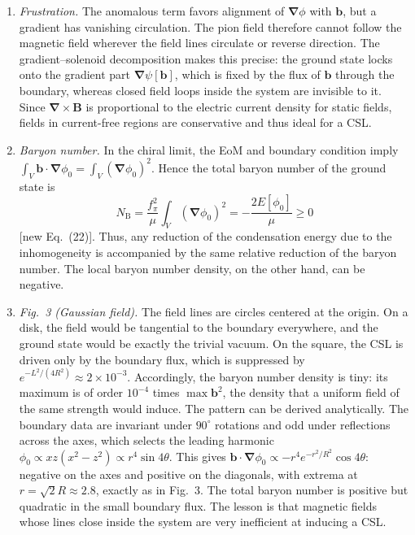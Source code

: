 \documentclass[11pt,a4paper]{article}
\newcommand{\vek}[1]{\bm{#1}}
\newcommand{\grad}{\vek\nabla}
\begin{document}
\begin{enumerate}[label=(\alph*)]
\item \emph{Frustration.} The anomalous term favors alignment of $\grad\phi$ with $\vek b$, but a gradient has vanishing circulation. The pion field therefore cannot follow the magnetic field wherever the field lines circulate or reverse direction. The gradient--solenoid decomposition makes this precise: the ground state locks onto the gradient part $\grad\psi[\vek b]$, which is fixed by the flux of $\vek b$ through the boundary, whereas closed field loops inside the system are invisible to it. Since $\grad\times\vek B$ is proportional to the electric current density for static fields, fields in current-free regions are conservative and thus ideal for a CSL.

\item \emph{Baryon number.} In the chiral limit, the EoM and boundary condition imply $\int_V\vek b\cdot\grad\phi_0=\int_V(\grad\phi_0)^2$. Hence the total baryon number of the ground state is
\begin{equation*}
N_\text{B}=\frac{f_\pi^2}{\mu}\int_V(\grad\phi_0)^2=-\frac{2E[\phi_0]}{\mu}\geq0
\end{equation*}
[new Eq.~(22)]. Thus, any reduction of the condensation energy due to the inhomogeneity is accompanied by the same relative reduction of the baryon number. The local baryon number density, on the other hand, can be negative.

\item \emph{Fig.~3 (Gaussian field).} The field lines are circles centered at the origin. On a disk, the field would be tangential to the boundary everywhere, and the ground state would be exactly the trivial vacuum. On the square, the CSL is driven only by the boundary flux, which is suppressed by $e^{-L^2/(4R^2)}\approx2\times10^{-3}$. Accordingly, the baryon number density is tiny: its maximum is of order $10^{-4}$ times $\max\vek b^2$, the density that a uniform field of the same strength would induce. The pattern can be derived analytically. The boundary data are invariant under $90^\circ$ rotations and odd under reflections across the axes, which selects the leading harmonic $\phi_0\propto xz(x^2-z^2)\propto r^4\sin4\theta$. This gives $\vek b\cdot\grad\phi_0\propto-r^4e^{-r^2/R^2}\cos4\theta$: negative on the axes and positive on the diagonals, with extrema at $r=\sqrt2R\approx2.8$, exactly as in Fig.~3. The total baryon number is positive but quadratic in the small boundary flux. The lesson is that magnetic fields whose lines close inside the system are very inefficient at inducing a CSL.


\end{enumerate}
\end{document}
